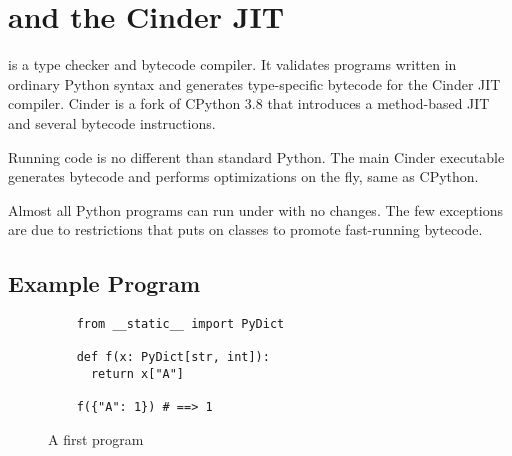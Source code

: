 \documentclass[a4paper,english,cleveref,autoref,thm-restate,anonymous,]{lipics-v2021}
\begin{document}
\section{\SP{} and the Cinder JIT}
\label{s:tour}

\SP{} is a type checker and bytecode compiler.
It validates programs written in ordinary Python syntax
and generates type-specific bytecode for the Cinder JIT compiler.
Cinder is a fork of CPython 3.8 that introduces a method-based
JIT and several bytecode instructions.

Running \SP{} code is no different than standard Python.
The main Cinder executable generates bytecode and performs
optimizations on the fly, same as CPython.

Almost all Python programs can run under \SP{} with no changes.
The few exceptions are due to restrictions that \SP{} puts
on classes to promote fast-running bytecode.


\subsection{Example Program}

\begin{figure}
  \begin{verbatim}
    from __static__ import PyDict

    def f(x: PyDict[str, int]):
      return x["A"]

    f({"A": 1}) # ==> 1
  \end{verbatim}
%
%
%
%
  \caption{A first \SP{} program}
  \label{fig:sp-example}
\end{figure}
\end{document}
